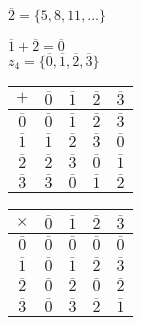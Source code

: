 \documentclass[a4paper, 11pt, twoside]{article}
\begin{document}
$\overline{2}=\{5, 8, 11,\dots\}$

$\overline{1}+\overline{2}=\overline{0}$\\

$z_4=\{\overline{0}, \overline{1}, \overline{2}, \overline{3}\}$

\begin{table}[htbp!] 
	\centering
	\begin{tabular}{|c|c|c|c|c|}
		\hline
		$+$ & $\overline{0}$ & $\overline{1}$ & $\overline{2}$ & $\overline{3}$ \\
		\hline
		$\overline{0}$ & $\overline{0}$ & $\overline{1}$ & $\overline{2}$ & $\overline{3}$ \\
		\hline
		$\overline{1}$ & $\overline{1}$ & $\overline{2}$ & $\overline{3}$ & $\overline{0}$ \\
		\hline
		$\overline{2}$ & $\overline{2}$ & $\overline{3}$ & $\overline{0}$ & $\overline{1}$ \\
		\hline
		$\overline{3}$ & $\overline{3}$ & $\overline{0}$ & $\overline{1}$ & $\overline{2}$ \\
		\hline
	\end{tabular}
\end{table}

\begin{table}[htbp!] 
	\centering
	\begin{tabular}{|c|c|c|c|c|}
		\hline
		$\times$ & $\overline{0}$ & $\overline{1}$ & $\overline{2}$ & $\overline{3}$ \\
		\hline
		$\overline{0}$ & $\overline{0}$ & $\overline{0}$ & $\overline{0}$ & $\overline{0}$ \\
		\hline
		$\overline{1}$ & $\overline{0}$ & $\overline{1}$ & $\overline{2}$ & $\overline{3}$ \\
		\hline
		$\overline{2}$ & $\overline{0}$ & $\overline{2}$ & $\overline{0}$ & $\overline{2}$ \\
		\hline
		$\overline{3}$ & $\overline{0}$ & $\overline{3}$ & $\overline{2}$ & $\overline{1}$ \\
		\hline
	\end{tabular}
\end{table}
\end{document}
